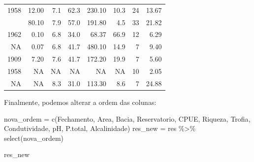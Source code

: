 \documentclass[
]{book}
\newenvironment{Shaded}{\begin{snugshade}}{\end{snugshade}}
\newcommand{\FunctionTok}[1]{\textcolor[rgb]{0.00,0.00,0.00}{#1}}
\newcommand{\NormalTok}[1]{#1}
\newcommand{\OtherTok}[1]{\textcolor[rgb]{0.56,0.35,0.01}{#1}}
\newcommand{\SpecialCharTok}[1]{\textcolor[rgb]{0.00,0.00,0.00}{#1}}
\newcommand{\StringTok}[1]{\textcolor[rgb]{0.31,0.60,0.02}{#1}}
\begin{document}
\begin{table}
\begin{tabular}{rrrrrrrr}
1958 & 12.00 & 7.1 & 62.3 & 230.10 & 10.3 & 24 & 13.67\\
\addlinespace
1989 & 80.10 & 7.9 & 57.0 & 191.80 & 4.5 & 33 & 21.82\\
1962 & 0.10 & 6.8 & 34.0 & 68.37 & 66.9 & 12 & 6.29\\
NA & 0.07 & 6.8 & 41.7 & 480.10 & 14.9 & 7 & 9.40\\
1909 & 7.20 & 7.6 & 41.7 & 172.20 & 19.9 & 7 & 5.60\\
1958 & NA & NA & NA & NA & NA & 10 & 2.05\\
\addlinespace
NA & NA & 8.3 & 31.0 & 113.30 & 8.6 & 7 & 24.88\\
\bottomrule
\end{tabular}
\endgroup{}
\end{table}

Finalmente, podemos alterar a ordem das colunas:

\begin{Shaded}
\begin{Highlighting}[]
\NormalTok{nova\_ordem }\OtherTok{=} \FunctionTok{c}\NormalTok{(}\StringTok{\textquotesingle{}Fechamento\textquotesingle{}}\NormalTok{, }\StringTok{\textquotesingle{}Area\textquotesingle{}}\NormalTok{, }\StringTok{\textquotesingle{}Bacia\textquotesingle{}}\NormalTok{, }\StringTok{\textquotesingle{}Reservatorio\textquotesingle{}}\NormalTok{, }\StringTok{\textquotesingle{}CPUE\textquotesingle{}}\NormalTok{, }\StringTok{\textquotesingle{}Riqueza\textquotesingle{}}\NormalTok{,}
               \StringTok{\textquotesingle{}Trofia\textquotesingle{}}\NormalTok{, }\StringTok{\textquotesingle{}Condutividade\textquotesingle{}}\NormalTok{, }\StringTok{\textquotesingle{}pH\textquotesingle{}}\NormalTok{, }\StringTok{\textquotesingle{}P.total\textquotesingle{}}\NormalTok{, }\StringTok{\textquotesingle{}Alcalinidade\textquotesingle{}}\NormalTok{)}
\NormalTok{res\_new }\OtherTok{=}\NormalTok{ res }\SpecialCharTok{\%\textgreater{}\%} 
  \FunctionTok{select}\NormalTok{(nova\_ordem)}

\NormalTok{res\_new}
\end{Highlighting}
\end{Shaded}
\end{document}
